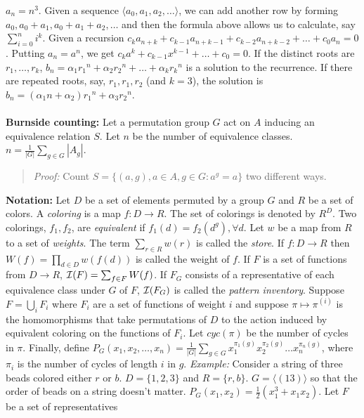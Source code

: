 $a_n = n^3$.  Given a sequence $\langle a_0, a_1, a_2, \ldots \rangle$, we can add another row by forming
$a_0, a_0 + a_1, a_0 + a_1 +  a_2, \ldots$ and then the formula above allows us to calculate, say $\sum_{i=0}^n i^k$.
Given a recursion $c_k a_{n+k} + c_{k - 1} a_{n+k-1} + c_{k - 2} a_{n+k-2} + \ldots +c_{0} a_{n} =0$.  Putting
$a_n = a^n$, we get $c_k a^k + c_{k - 1} x^{k-1}  + \ldots +c_{0} =0$.  If the distinct
roots are $r_1, \ldots , r_k$, $b_n = \alpha_1 {r_1}^n + \alpha_2 {r_2}^n + \ldots +\alpha_k {r_k}^n$ is a solution
to the recurrence.   If there are repeated roots, say, $r_1, r_1, r_2$ (and $k=3$), the solution is
$b_n= (\alpha_1 n +\alpha_2) {r_1}^n + \alpha_3 {r_2}^n$.
\\
\\
{\bf Burnside counting:}  Let a permutation group $G$ act on $A$ inducing an equivalence
relation $S$.  Let $n$ be the number of equivalence classes.
$n= {\frac 1 {|G|}} \sum_{g \in G} |A_g|$.
\begin{quote}
\emph{Proof:}  Count
$S= \{ (a,g), a \in A, g \in G: a^g=a \}$ two different ways.
\end{quote}
{\bf Notation:}
Let $D$ be a set of elements permuted by
a group $G$ and $R$ be a set of colors.  A \emph{coloring} is a map $f:D \rightarrow R$.
The set of colorings is denoted by $R^D$.
Two colorings, $f_1 , f_2$, are \emph{equivalent}
if $f_1(d) = f_2 (d^g ), \forall d$.  Let $w$ be a map from $R$ to a set of \emph{weights}.
The term $\sum_{r \in R} w(r)$ is called the \emph{store}.  If $f: D \rightarrow R$ then
$W(f)= \prod_{d \in D} w(f(d))$ is called the weight of $f$.  If $F$ is a set of
functions from $D \rightarrow R$, ${\cal I}(F)= \sum_{f \in F} W(f)$.  If
$F_G$ consists of a representative of each equivalence class under $G$ of $F$,
${\cal I}(F_G)$ is called the \emph{pattern inventory}.
Suppose $F= \bigcup_i F_i$ where $F_i$ are a set of functions of
weight $i$ and suppose $\pi \mapsto \pi^{(i)}$ is the homomorphisms that
take permutations of $D$ to the
action induced by equivalent coloring on the functions of $F_i$.  
Let $cyc(\pi)$ be the number of cycles in $\pi$.
Finally, define
$P_{G}(x_{1}, x_{2}, \ldots , x_{n})= {\frac {1} {|G|}} \sum_{g \in G}
x_{1}^{\pi_{1}(g)} x_{2}^{\pi_{2}(g)} \ldots x_{n}^{\pi_{n}(g)}$, where $\pi_i$ is the number
of cycles of length $i$ in $g$.
\emph{Example:}  Consider a string of three beads colored either $r$ or $b$.  
$D= \{1,2,3\}$ and $R= \{r, b\}$.  
$G= \langle (13) \rangle$ so that the order of beads on a string doesn't matter.
$P_G(x_1, x_2)= {\frac 1 2} (x_1^3 + x_1 x_2)$.  Let $F$ be a set of representatives
